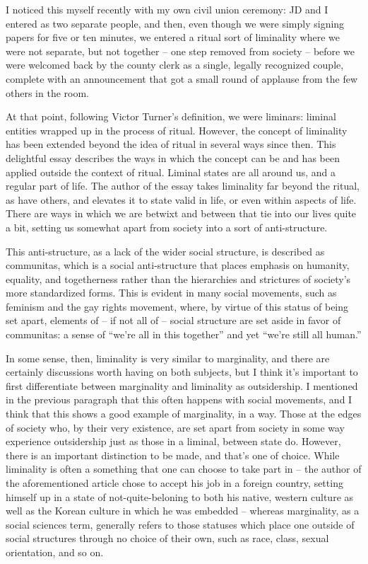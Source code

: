 I noticed this myself recently with my own civil union ceremony: JD and I entered as two separate people, and then, even though we were simply signing papers for five or ten minutes, we entered a ritual sort of liminality where we were not separate, but not together -- one step removed from society -- before we were welcomed back by the county clerk as a single, legally recognized couple, complete with an announcement that got a small round of applause from the few others in the room.

At that point, following Victor Turner's definition, we were liminars: liminal entities wrapped up in the process of ritual. However, the concept of liminality has been extended beyond the idea of ritual in several ways since then. This delightful essay describes the ways in which the concept can be and has been applied outside the context of ritual. Liminal states are all around us, and a regular part of life. The author of the essay takes liminality far beyond the ritual, as have others, and elevates it to state valid in life, or even within aspects of life. There are ways in which we are betwixt and between that tie into our lives quite a bit, setting us somewhat apart from society into a sort of anti-structure.

This anti-structure, as a lack of the wider social structure, is described as communitas, which is a social anti-structure that places emphasis on humanity, equality, and togetherness rather than the hierarchies and strictures of society's more standardized forms. This is evident in many social movements, such as feminism and the gay rights movement, where, by virtue of this status of being set apart, elements of -- if not all of -- social structure are set aside in favor of communitas: a sense of ``we're all in this together'' and yet ``we're still all human.''

In some sense, then, liminality is very similar to marginality, and there are certainly discussions worth having on both subjects, but I think it's important to first differentiate between marginality and liminality as outsidership. I mentioned in the previous paragraph that this often happens with social movements, and I think that this shows a good example of marginality, in a way. Those at the edges of society who, by their very existence, are set apart from society in some way experience outsidership just as those in a liminal, between state do. However, there is an important distinction to be made, and that's one of choice. While liminality is often a something that one can choose to take part in -- the author of the aforementioned article chose to accept his job in a foreign country, setting himself up in a state of not-quite-beloning to both his native, western culture as well as the Korean culture in which he was embedded -- whereas marginality, as a social sciences term, generally refers to those statuses which place one outside of social structures through no choice of their own, such as race, class, sexual orientation, and so on.

